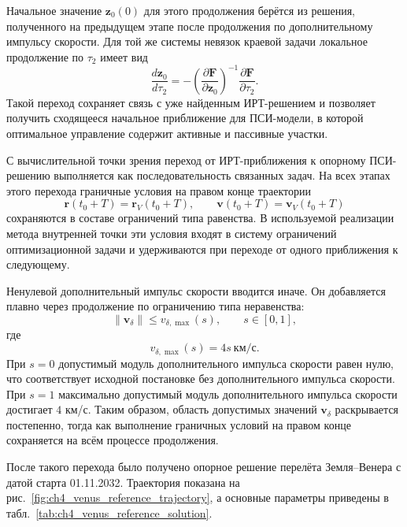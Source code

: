 Начальное значение \(\mathbf z_0(0)\) для этого продолжения берётся из решения, полученного на предыдущем этапе после продолжения по дополнительному импульсу скорости. Для той же системы невязок краевой задачи локальное продолжение по \(\tau_2\) имеет вид
\begin{equation}
	\frac{d\mathbf z_0}{d\tau_2}
	=
	-
	\left(
	\frac{\partial \mathbf F}{\partial \mathbf z_0}
	\right)^{-1}
	\frac{\partial \mathbf F}{\partial \tau_2}.
	\label{eq:ch4_psi_continuation_z0}
\end{equation}
Такой переход сохраняет связь с уже найденным ИРТ-решением и позволяет получить сходящееся начальное приближение для ПСИ-модели, в которой оптимальное управление содержит активные и пассивные участки.

С вычислительной точки зрения переход от ИРТ-приближения к опорному ПСИ-решению выполняется как последовательность связанных задач. На всех этапах этого перехода граничные условия на правом конце траектории
\begin{equation}
	\mathbf r(t_0+T)=\mathbf r_V(t_0+T),
	\qquad
	\mathbf v(t_0+T)=\mathbf v_V(t_0+T)
\end{equation}
сохраняются в составе ограничений типа равенства. В используемой реализации метода внутренней точки эти условия входят в систему ограничений оптимизационной задачи и удерживаются при переходе от одного приближения к следующему.

Ненулевой дополнительный импульс скорости вводится иначе. Он добавляется плавно через продолжение по ограничению типа неравенства:
\begin{equation}
	\|\mathbf v_\delta\|
	\leq
	v_{\delta,\max}(s),
	\qquad
	s\in[0,1],
\end{equation}
где
\begin{equation}
	v_{\delta,\max}(s)
	=
	4s\ \text{км/с}.
\end{equation}
При \(s=0\) допустимый модуль дополнительного импульса скорости равен нулю, что соответствует исходной постановке без дополнительного импульса скорости. При \(s=1\) максимально допустимый модуль дополнительного импульса скорости достигает \(4\) км/с. Таким образом, область допустимых значений \(\mathbf v_\delta\) раскрывается постепенно, тогда как выполнение граничных условий на правом конце сохраняется на всём процессе продолжения.

После такого перехода было получено опорное решение перелёта Земля--Венера с датой старта 01.11.2032. Траектория показана на рис.~\ref{fig:ch4_venus_reference_trajectory}, а основные параметры приведены в табл.~\ref{tab:ch4_venus_reference_solution}.

